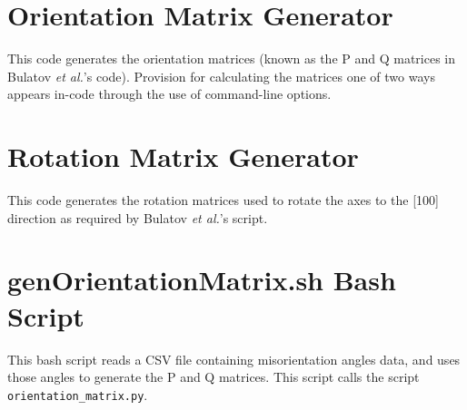 \documentclass[twoside,senior]{BYUPhys}
\begin{document}
\chapter{Orientation Matrix Generator\label{app:OrientationMatrix}}
This code generates the orientation matrices (known as the P and Q matrices in Bulatov \emph{et al.}'s code). Provision for calculating the matrices one of two ways appears in-code through the use of command-line options.



\chapter{Rotation Matrix Generator\label{app:RotationMatrix}}
This code generates the rotation matrices used to rotate the axes to the [100] direction as required by Bulatov \emph{et al.}'s script.



\chapter{genOrientationMatrix.sh Bash Script\label{app:genOrientationMatrix}}
This bash script reads a CSV file containing misorientation angles data, and uses those angles to generate the P and Q matrices.  This script calls the script \lstinline!orientation_matrix.py!.




 \cleardoublepage
 \singlespace
 \printindex
\end{document}
